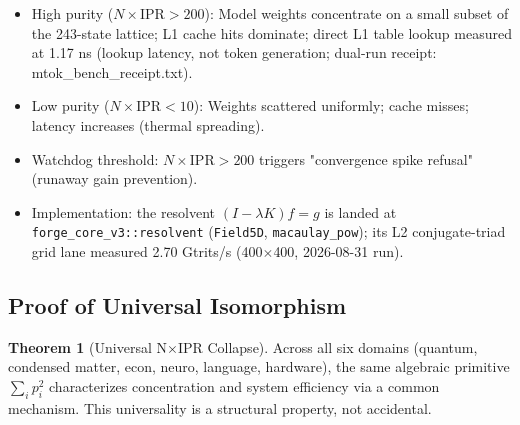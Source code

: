 \documentclass[11pt,oneside]{article}
\theoremstyle{definition}
\newtheorem{theorem}{Theorem}
\begin{document}
\begin{itemize}
  \item High purity ($N \times \text{IPR} > 200$): Model weights concentrate on a small subset of the 243-state lattice; L1 cache hits dominate; direct L1 table lookup measured at 1.17 ns (lookup latency, not token generation; dual-run receipt: mtok\_bench\_receipt.txt).
  \item Low purity ($N \times \text{IPR} < 10$): Weights scattered uniformly; cache misses; latency increases (thermal spreading).
  \item Watchdog threshold: $N \times \text{IPR} > 200$ triggers "convergence spike refusal" (runaway gain prevention).
  \item Implementation: the resolvent $(I - \lambda K)f = g$ is landed at \texttt{forge\_core\_v3::resolvent} (\texttt{Field5D}, \texttt{macaulay\_pow}); its L2 conjugate-triad grid lane measured 2.70 Gtrits/s (400$\times$400, 2026-08-31 run).
\end{itemize}

\subsection{Proof of Universal Isomorphism}

\begin{theorem}[Universal N\ensuremath{\times}IPR Collapse]
Across all six domains (quantum, condensed matter, econ, neuro, language, hardware), the same algebraic primitive $\sum_i p_i^2$ characterizes concentration and system efficiency via a common mechanism. This universality is a structural property, not accidental.
\end{theorem}
\end{document}
